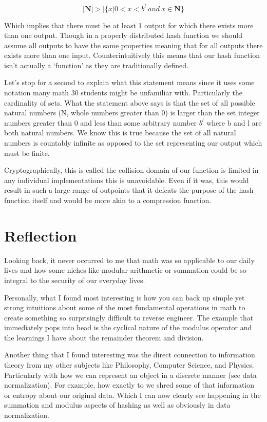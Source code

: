 \documentclass[11pt, oneside]{article}   	%
\begin{document}
\begin{equation}
    |\mathbf{N}| > |\{x|0 < x < b^l\ and\ x \in \mathbf{N}\}
\end{equation}

Which implies that there must be at least 1 output for which there exists more than one output. Though in a properly distributed hash function we should assume all outputs to have the same properties meaning that for all outputs there exists more than one input. Counterintuitively this means that our hash function isn’t actually a ‘function’ as they are traditionally defined.

Let’s stop for a second to explain what this statement means since it uses some notation many math 30 students might be unfamiliar with. Particularly the cardinality of sets. What the statement above says is that the set of all possible natural numbers (N, whole numbers greater than 0) is larger than the set integer numbers greater than 0 and less than some arbitrary number $b^l$ where b and l are both natural numbers. We know this is true because the set of all natural numbers is countably infinite as opposed to the set representing our output which must be finite.

Cryptographically, this is called the collision domain of our function is limited in any individual implementations this is unavoidable. Even if it was, this would result in such a large range of outpoints that it defeats the purpose of the hash function itself and would be more akin to a compression function.

\section{Reflection}

Looking back, it never occurred to me that math was so applicable to our daily lives and how some niches like modular arithmetic or summation could be so integral to the security of our everyday lives.

Personally, what I found most interesting is how you can back up simple yet strong intuitions about some of the most fundamental operations in math to create something so surprisingly difficult to reverse engineer. The example that immediately pops into head is the cyclical nature of the modulus operator and the learnings I have about the remainder theorem and division.

Another thing that I found interesting was the direct connection to information theory from my other subjects like Philosophy, Computer Science, and Physics. Particularly with how we can represent an object in a discrete manner (see data normalization). For example, how exactly to we shred some of that information or entropy about our original data. Which I can now clearly see happening in the summation and modulus aspects of hashing as well as obviously in data normalization.
\end{document}
